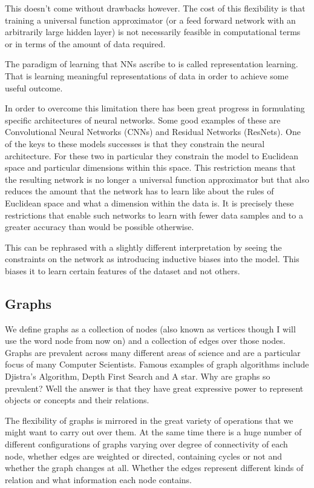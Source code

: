 \documentclass[]{../resources/final_report}
\begin{document}
This doesn't come without drawbacks however. The cost of this flexibility is that 
training a universal function approximator (or a feed forward network with an arbitrarily 
large hidden layer) is not necessarily feasible in computational terms or in terms of 
the amount of data required.

The paradigm of learning that NNs ascribe to is called representation learning. That is learning
meaningful representations of data in order to achieve some useful outcome.

In order to overcome this limitation there has been great progress in 
formulating specific architectures of neural networks. Some good examples of these 
are Convolutional Neural Networks (CNNs) and Residual Networks (ResNets). 
One of the keys to these models successes is that they constrain the neural architecture.
For these two in particular they constrain the model to Euclidean space and 
particular dimensions within this space. This restriction means that 
the resulting network is no longer a universal function approximator but that 
also reduces the amount that the network has to learn like about the rules of Euclidean space and what
a dimension within the data is. It is precisely these restrictions that 
enable such networks to learn with fewer data samples and to a greater accuracy
than would be possible otherwise.

This can be rephrased with a slightly different interpretation by seeing the constraints on
the network as introducing inductive biases into the model. This biases it to learn
certain features of the dataset and not others. 

\subsection{Graphs}

We define graphs as a collection of nodes (also known as vertices though I will use the word node from now on) 
and a collection of edges over those nodes.
Graphs are prevalent across many different areas of science and are a particular focus of
many Computer Scientists. Famous examples of graph algorithms include Djistra's Algorithm, Depth First Search and A star.
Why are graphs so prevalent? Well the answer is that they have great expressive power to 
represent objects or concepts and their relations.

The flexibility of graphs is mirrored in the great variety of operations that we might want 
to carry out over them. At the same time there is a huge number of different configurations 
of graphs varying over degree of connectivity of each node, whether edges are weighted or directed, 
containing cycles or not and whether the graph changes at all.
Whether the edges represent different kinds of relation and what information each node contains.
\end{document}
